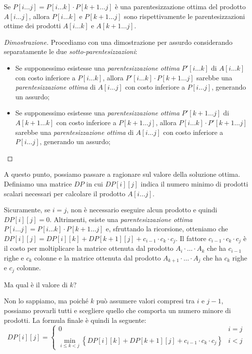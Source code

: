\begin{definition}
    Se $P[i\dots j]=P[i\dots k]\cdot P[k+1\dots j]$ è una parentesizzazione
    ottima del prodotto $A[i\dots j]$, allora $P[i\dots k]$ e $P[k+1\dots j]$
    sono rispettivamente le parentesizzazioni ottime dei prodotti $A[i\dots k]$
    e $A[k+1\dots j]$.
\end{definition}
\begin{proof}[Dimostrazione]
    Procediamo con una dimostrazione per assurdo considerando separatamente le due
    \emph{sotto-parentesizzazioni}:
    \begin{itemize}
        \item Se supponessimo esistesse una \emph{parentesizzazione ottima}
        $P'[i\dots k]$ di $A[i\dots k]$ con costo inferiore a $P[i\dots k]$,
        allora $P'[i\dots k]\cdot P[k+1\dots j]$ sarebbe una
        \emph{parentesizzazione ottima} di $A[i\dots j]$ con costo inferiore a
        $P[i\dots j]$, generando un assurdo;
        \item Se supponessimo esistesse una \emph{parentesizzazione ottima}
        $P'[k+1\dots j]$ di $A[k+1\dots k]$ con costo inferiore a $P[k+1\dots j]$,
        allora $P[i\dots k]\cdot P'[k+1\dots j]$ sarebbe una
        \emph{parentesizzazione ottima} di $A[i\dots j]$ con costo inferiore a
        $P[i\dots j]$, generando un assurdo;
    \end{itemize}
\end{proof}

\noindent
A questo punto, possiamo passare a ragionare sul valore della soluzione ottima.
Definiamo una matrice $DP$ in cui $DP[i][j]$ indica il numero minimo di prodotti
scalari necessari per calcolare il prodotto $A[i\dots j]$.

Sicuramente, se $i=j$, non è necessario eseguire alcun prodotto e quindi $DP[i][j]=0$.
Altrimenti, esiste una \emph{parentesizzazione ottima} $P[i\dots j]=P[i\dots k]
\cdot P[k+1\dots j]$ e, sfruttando la ricorsione, otteniamo che $DP[i][j]=DP[i][k]
+DP[k+1][j]+c_{i-1}\cdot c_k\cdot c_j$. Il fattore $c_{i-1}\cdot c_k\cdot c_j$ è
il costo per moltiplicare la matrice ottenuta dal prodotto $A_i\cdot\ldots\cdot A_k$
che ha $c_{i-1}$ righe e $c_k$ colonne e la matrice ottenuta dal prodotto
$A_{k+1}\cdot\ldots\cdot A_j$ che ha $c_k$ righe e $c_j$ colonne.

\bigskip\noindent
Ma qual è il valore di $k$?

Non lo sappiamo, ma poiché $k$ può assumere valori compresi tra $i$ e $j-1$,
possiamo provarli tutti e scegliere quello che comporta un numero minore di
prodotti. La formula finale è quindi la seguente:
\[DP[i][j]=\begin{cases}
    0 & i=j\\
    \min_{i\leq k<j}\left\{DP[i][k]+DP[k+1][j]+c_{i-1}\cdot c_k\cdot c_j\right\} &
    i<j
\end{cases}\]

